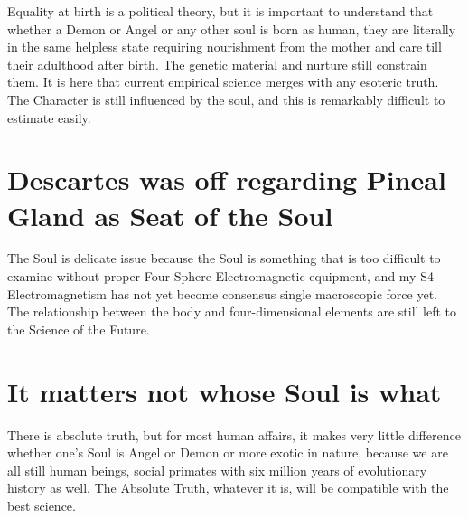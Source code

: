 \documentclass{amsart}
\begin{document}
Equality at birth is a political theory, but it is important to understand that whether a Demon or Angel or any other soul is born as human, they are literally in the same helpless state requiring nourishment from the mother and care till their adulthood after birth.  The genetic material and nurture still constrain them. It is here that current empirical science merges with any esoteric truth.  The Character is still influenced by the soul, and this is remarkably difficult to estimate easily.

\section{Descartes was off regarding Pineal Gland as Seat of the Soul}

The Soul is delicate issue because the Soul is something that is too difficult to examine without proper Four-Sphere Electromagnetic equipment, and my S4 Electromagnetism has not yet become consensus single macroscopic force yet.  The relationship between the body and four-dimensional elements are still left to the Science of the Future.

\section{It matters not whose Soul is what}

There is absolute truth, but for most human affairs, it makes very little difference whether one's Soul is Angel or Demon or more exotic in nature, because we are all still human beings, social primates with six million years of evolutionary history as well.  The Absolute Truth, whatever it is, will be compatible with the best science.
\end{document}
